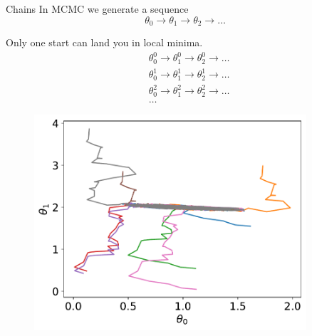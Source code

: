 \documentclass[
aspectratio=169,
14pt,
professionalfonts
]{beamer}
\begin{document}
\begin{frame}{Chains}
    In MCMC we generate a sequence
    $$
    \theta_0 \to \theta_1 \to \theta_2 \to \ldots
    $$
    \begin{minipage}{0.49\textwidth}
        Only one start can land you in local minima.
        \begin{align*}
            &\theta_0^0 \to \theta_1^0 \to \theta_2^0 \to \ldots \\
            &\theta_0^1 \to \theta_1^1 \to \theta_2^1 \to \ldots \\
            &\theta_0^2 \to \theta_1^2 \to \theta_2^2 \to \ldots \\
            &\ldots
        \end{align*}
    \end{minipage}
    \begin{minipage}{0.49\textwidth}
        \begin{figure}
            \centering
            \includegraphics[width=0.9\textwidth]{../plots/chain_walk.pdf}
        \end{figure}
    \end{minipage}

\end{frame}
\end{document}
